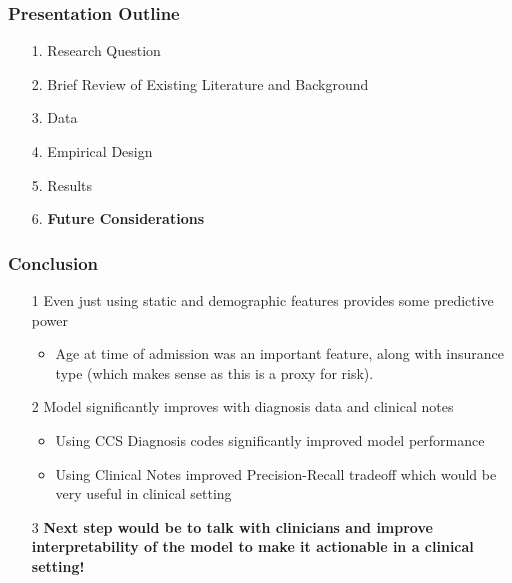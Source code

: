 \documentclass{beamer}
\begin{document}
\begin{frame}
\label{Presentation Outline 7}
\frametitle{Presentation Outline}
\begin{enumerate}
\item[1.] Research Question
\newline
\item[2.] Brief Review of Existing Literature and Background
\newline
\item[3.] Data
\newline
\item[4.] Empirical Design
\newline
\item[5.] Results
\newline
\item[6.] \textbf{Future Considerations}
\end{enumerate}
\end{frame}

\begin{frame}
\label{Conclusion}
\frametitle{Conclusion}
\begin{itemize}
\item[1] Even just using static and demographic features provides some predictive power
	\begin{itemize}
		\item Age at time of admission was an important feature, along with insurance type (which makes sense as this is a proxy for risk).
	\end{itemize}
\item[2] Model significantly improves with diagnosis data and clinical notes
	\begin{itemize}
		\item Using CCS Diagnosis codes significantly improved model performance 
		\item Using Clinical Notes improved Precision-Recall tradeoff which would be very useful in clinical setting
	\end{itemize}
\item[3] \textbf{Next step would be to talk with clinicians and improve interpretability of the model to make it actionable in a clinical setting!}
\end{itemize}
\end{frame}
\end{document}
